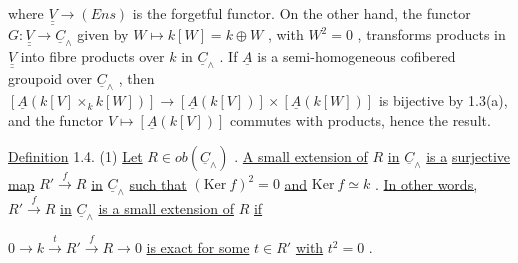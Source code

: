 \begin{center}
\end{center}
where  $\underline{\underline{V}} \to (Ens)$  is the forgetful functor. On the other hand, the functor
$G : \underline{\underline{V}} \longrightarrow \underline{C}_{\wedge}$  given by  $W \longmapsto k[W] = k \oplus W$ , with  $W^{2} = 0$ , transforms
products in  $\underline{\underline{V}}$  into fibre products over  $k$  in  $\underline{C}_{\wedge}$ . If  $\underline{A}$  is a semi-homogeneous cofibered groupoid over  $\underline{C}_{\wedge}$ , then  $[\underline{A}(k[V] \times_{k} k[W])] \longrightarrow [\underline{A}(k[V])] \times [\underline{A}(k[W])]$
is bijective by 1.3(a), and the functor  $V \longmapsto [\underline{A}(k[V])]$  commutes with products,
hence the result.

\underline{Definition} 1.4. (1) \underline{Let}  $R \in ob(\underline{C}_{\wedge})$ . \underline{A small extension of}  $R$  \underline{in}  $\underline{C}_{\wedge}$  \underline{is a}
\underline{surjective map}  $R' \xrightarrow{\ f\ } R$  \underline{in}  $\underline{C}_{\wedge}$  \underline{such that}  $(\mathrm{Ker}\ f)^{2} = 0$  \underline{and}  $\mathrm{Ker}\ f \simeq k$ .
\underline{In other words,}  $R' \xrightarrow{\ f\ } R$  \underline{in}  $\underline{C}_{\wedge}$  \underline{is a small extension of}  $R$  \underline{if}

$0 \longrightarrow k \xrightarrow{\ t\ } R' \xrightarrow{\ f\ } R \longrightarrow 0$
\underline{is exact for some}  $t \in R'$  \underline{with}  $t^{2} = 0$ .

